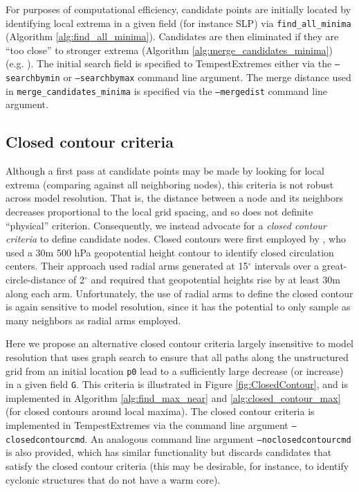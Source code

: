 \documentclass[gmdd, hvmath, online]{copernicus_discussions}
\begin{document}
For purposes of computational efficiency, candidate points are initially located by identifying local extrema in a given field (for instance SLP) via \texttt{find\_all\_minima} (Algorithm \ref{alg:find_all_minima}).  Candidates are then eliminated if they are ``too close'' to stronger extrema (Algorithm \ref{alg:merge_candidates_minima}) (e.g. \cite{pinto2005sensitivities}).  The initial search field is specified to TempestExtremes either via the \texttt{--searchbymin} or \texttt{--searchbymax} command line argument.  The merge distance used in \texttt{merge\_candidates\_minima} is specified via the \texttt{--mergedist} command line argument.

\subsection{Closed contour criteria} \label{sec:ClosedContour}

Although a first pass at candidate points may be made by looking for local extrema (comparing against all neighboring nodes), this criteria is not robust across model resolution.  That is, the distance between a node and its neighbors decreases proportional to the local grid spacing, and so does not definite ``physical'' criterion.  Consequently, we instead advocate for a \textit{closed contour criteria} to define candidate nodes.  Closed contours were first employed by \cite{bell198915}, who used a 30m 500 hPa geopotential height contour to identify closed circulation centers.  Their approach used radial arms generated at 15$^\circ$ intervals over a great-circle-distance of 2$^\circ$ and required that geopotential heights rise by at least 30m along each arm.  Unfortunately, the use of radial arms to define the closed contour is again sensitive to model resolution, since it has the potential to only sample as many neighbors as radial arms employed.

Here we propose an alternative closed contour criteria largely insensitive to model resolution that uses graph search to ensure that all paths along the unstructured grid from an initial location \texttt{p0} lead to a sufficiently large decrease (or increase) in a given field \texttt{G}.  This criteria is illustrated in Figure \ref{fig:ClosedContour}, and is implemented in Algorithm \ref{alg:find_max_near} and \ref{alg:closed_contour_max} (for closed contours around local maxima).  The closed contour criteria is implemented in TempestExtremes via the command line argument \texttt{--closedcontourcmd}.  An analogous command line argument \texttt{--noclosedcontourcmd} is also provided, which has similar functionality but discards candidates that satisfy the closed contour criteria (this may be desirable, for instance, to identify cyclonic structures that do not have a warm core).
\end{document}
